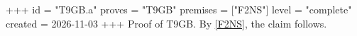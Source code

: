 +++
id = "T9GB.a"
proves = "T9GB"
premises = ["F2NS"]
level = "complete"
created = 2026-11-03
+++
Proof of T9GB. By \ref{F2NS}, the claim follows.
